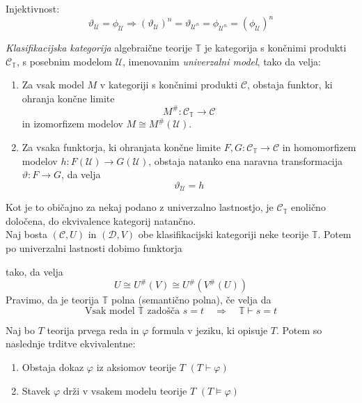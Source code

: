 \documentclass[../kategoricna_logika.tex]{subfiles}
\begin{document}
Injektivnost:
$$\vartheta_\mathcal{U} = \phi_\mathcal{U} \Rightarrow
(\vartheta_\mathcal{U})^n = \vartheta_{\mathcal{U}^n} =
\phi_{\mathcal{U}^n} = (\phi_\mathcal{U})^n$$
\begin{definicija}
  \emph{Klasifikacijska kategorija} algebraične teorije $\mathbb{T}$
  je kategorija s končnimi produkti $\mathcal{C}_\mathbb{T}$, s
  posebnim modelom $\mathcal{U}$, imenovanim \emph{univerzalni model},
  tako da velja:
  \begin{enumerate}
  \item Za vsak model $M$ v kategoriji s končnimi produkti
    $\mathcal{C}$, obstaja funktor, ki ohranja končne limite
    $$M^{\#} : \mathcal{C}_\mathbb{T} \to \mathcal{C}$$ in izomorfizem
    modelov $M \cong M^{\#}(\mathcal{U})$.
%
  \item Za vsaka funktorja, ki ohranjata končne limite
    $F,G : \mathcal{C}_\mathbb{T} \to \mathcal{C}$ in homomorfizem
    modelov $h: F(\mathcal{U}) \to G(\mathcal{U})$, obstaja natanko
    ena naravna transformacija $\vartheta : F \to G$, da velja
$$\vartheta_\mathcal{U} = h$$
\end{enumerate}
\end{definicija}
Kot je to običajno za nekaj podano z univerzalno lastnostjo, je $\mathcal{C}_\mathbb{T}$ enolično določena, do ekvivalence kategorij natančno. \\
\vspace{1cm}
%
Naj bosta $(\mathcal{C}, U)$ in $(\mathcal{D}, V)$ obe klasifikacijski
kategoriji neke teorije $\mathbb{T}$. Potem po univerzalni lastnosti
dobimo funktorja
\begin{center}
\end{center}
tako, da velja
$$U \cong U^{\#}(V) \cong U^{\#}(V^{\#}(U))$$
Pravimo, da je teorija $\mathbb{T}$ polna (semantično polna), če velja
da
$$\text{Vsak model } \mathbb{T} \text{ zadošča }s=t \quad \Longrightarrow \quad \mathbb{T} \vdash s = t$$
\begin{izrek}[Gödel]
  Naj bo $T$ teorija prvega reda in $\varphi$ formula v jeziku, ki
  opisuje $T$. Potem so naslednje trditve ekvivalentne:
  \begin{enumerate}
  \item Obstaja dokaz $\varphi$ iz aksiomov teorije $T$
    $(T \vdash \varphi)$
  \item Stavek $\varphi$ drži v vsakem modelu teorije $T$
    $(T \models \varphi)$
  \end{enumerate}
\end{izrek}
\end{document}
